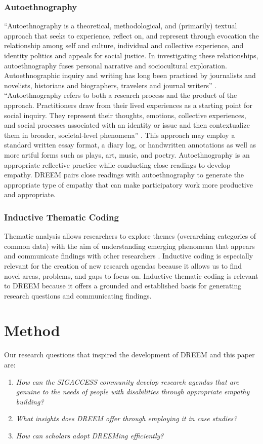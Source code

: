 \subsubsection{Autoethnography}
``Autoethnography is a theoretical, methodological, and (primarily) textual approach that seeks to experience, reflect on, and represent through evocation the relationship among self and culture, individual and collective experience, and identity politics and appeals for social justice. In investigating these relationships, autoethnography fuses personal narrative and sociocultural exploration. Autoethnographic inquiry and writing has long been practiced by journalists and novelists, historians and biographers, travelers and journal writers'' \cite{holmanjonesAutoethnography2007}. ``Autoethnography refers to both a research process and the product of the approach. Practitioners draw from their lived experiences as a starting point for social inquiry. They represent their thoughts, emotions, collective experiences, and social processes associated with an identity or issue and then contextualize them in broader, societal‐level phenomena'' \cite{ramboAutoethnography2020}. This approach may employ a standard written essay format, a diary log, or handwritten annotations as well as more artful forms such as plays, art, music, and poetry. Autoethnography is an appropriate reflective practice while conducting close readings to develop empathy. DREEM pairs close readings with autoethnography to generate the appropriate type of empathy that can make participatory work more productive and appropriate.

\subsubsection{Inductive Thematic Coding}
Thematic analysis allows researchers to explore themes (overarching categories of common data) with the aim of  understanding emerging phenomena that appears and communicate findings with other researchers \cite{guestAppliedThematicAnalysis2012}. Inductive coding is especially relevant for the creation of new research agendas because it allows us to find novel areas, problems, and gaps to focus on. Inductive thematic coding is relevant to DREEM because it offers a grounded and established basis for generating research questions and communicating findings. 


\section{Method}
Our research questions that inspired the development of DREEM and this paper are: 
\begin{enumerate}[label=RQ\arabic*:]
\item \textit{How can the SIGACCESS community develop research agendas that are genuine to the needs of people with disabilities through appropriate empathy building?}
\item \textit{What insights does DREEM offer through employing it in case studies?}
\item \textit{How can scholars adopt DREEMing efficiently?}
\end{enumerate}

